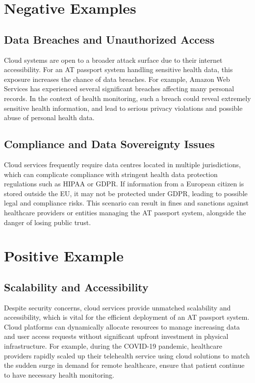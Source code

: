 \section{Negative Examples}
\subsection{Data Breaches and Unauthorized Access}
Cloud systems are open to a broader attack surface due to their internet
accessibility. For an AT passport system handling sensitive health data, this
exposure increases the chance of data breaches. For example, Amazon Web Services
has experienced several significant breaches affecting many personal records.
\cite{heiligenstein2022microsoft} In the context of health monitoring, such a
breach could reveal extremely sensitive health information, and lead to serious
privacy violations and possible abuse of personal health data.

\subsection{Compliance and Data Sovereignty Issues}
Cloud services frequently require data centres located in multiple
jurisdictions, which can complicate compliance with stringent health data
protection regulations such as HIPAA or GDPR. \cite{GDPR2016} If information
from a European citizen is stored outside the EU, it may not be protected under
GDPR, leading to possible legal and compliance risks. This scenario can result
in fines and sanctions against healthcare providers or entities managing the AT
passport system, alongside the danger of losing public trust. \cite{GDPR2016}

\section{Positive Example}
\subsection{Scalability and Accessibility}
Despite security concerns, cloud services provide unmatched scalability and
accessibility, which is vital for the efficient deployment of an AT passport
system. Cloud platforms can dynamically allocate resources to manage increasing
data and user access requests without significant upfront investment in physical
infrastructure. For example, during the COVID-19 pandemic, healthcare providers
rapidly scaled up their telehealth service using cloud solutions to match the
sudden surge in demand for remote healthcare, ensure that patient continue to
have necessary health monitoring. \cite{wood2020outcomes}

